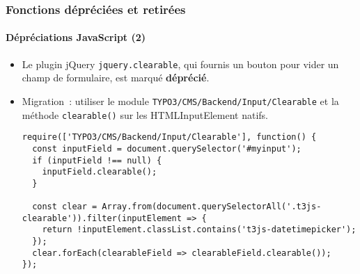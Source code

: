 
\begin{frame}[fragile]
	\frametitle{Fonctions dépréciées et retirées}
	\framesubtitle{Dépréciations JavaScript (2)}

	\lstset{basicstyle=\tiny\ttfamily}

	\begin{itemize}
		\item Le plugin jQuery \texttt{jquery.clearable},
			qui fournis un bouton pour vider un champ de formulaire, est marqué \textbf{déprécié}.
		\item Migration~: utiliser le module \small\texttt{TYPO3/CMS/Backend/Input/Clearable}\normalsize
			et la méthode \texttt{clearable()} sur les HTMLInputElement natifs.

\begin{lstlisting}
require(['TYPO3/CMS/Backend/Input/Clearable'], function() {
  const inputField = document.querySelector('#myinput');
  if (inputField !== null) {
    inputField.clearable();
  }

  const clear = Array.from(document.querySelectorAll('.t3js-clearable')).filter(inputElement => {
    return !inputElement.classList.contains('t3js-datetimepicker');
  });
  clear.forEach(clearableField => clearableField.clearable());
});
\end{lstlisting}

	\end{itemize}

\end{frame}


